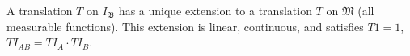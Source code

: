 A translation $T$ on $I_{\mathfrak{B}}$ has a unique extension to a translation $T$ on $\mathfrak{M}$ (all measurable functions). This extension is linear, continuous, and satisfies $T1=1$, $TI_{AB}=TI_A\cdot TI_B$.
